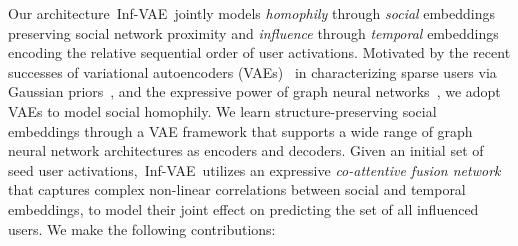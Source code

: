 \documentclass[sigconf]{acmart}
\newcommand{\name}{Inf-VAE}
\begin{document}
Our architecture~\name~jointly models \emph{homophily} through \emph{social} embeddings preserving social network proximity and \emph{influence} through \emph{temporal} embeddings encoding the relative sequential order of user activations.
Motivated by the recent successes of variational autoencoders (VAEs)~\cite{vae} in characterizing sparse users via
Gaussian priors~\cite{vaecf}, and the expressive power of graph neural networks~\cite{gcn, graph_enc_dec}, we adopt VAEs to model social homophily.
We learn structure-preserving social embeddings through a VAE framework that supports a wide range of graph neural network architectures as encoders and decoders.
Given an initial set of seed user activations,~\name~utilizes an expressive \textit{co-attentive fusion network} that captures complex non-linear correlations between social and temporal embeddings, to model their joint effect on predicting the set of all influenced users. We make the following contributions:
\end{document}
